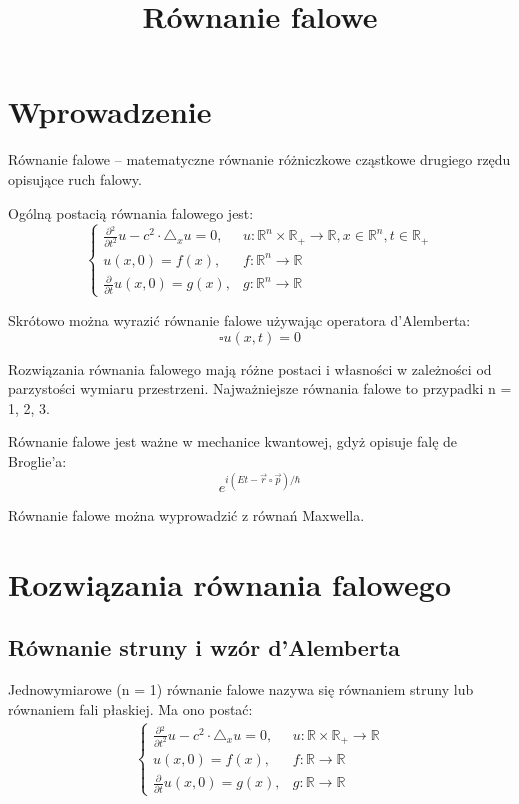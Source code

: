 \documentclass{article}
\begin{document}
\title{Równanie falowe}
\maketitle

\section*{Wprowadzenie}
Równanie falowe – matematyczne równanie różniczkowe cząstkowe drugiego rzędu opisujące ruch falowy. 

Ogólną postacią równania falowego jest: 
\begin{displaymath}
{\begin{cases}{\frac {\partial {}^{2}}{\partial t^{2}}}u-c^{2}\cdot \triangle _{x}u=0,&u:\mathbb {R} ^{n}\times \mathbb {R} _{+}\to {}\mathbb {R} ,x\in \mathbb {R} ^{n},t\in \mathbb {R} _{+}\\[2pt]u(x,0)=f(x),&f:\mathbb {R} ^{n}\to \mathbb {R} \\[2pt]{\frac {\partial {}}{\partial t}}u(x,0)=g(x),&g:\mathbb {R} ^{n}\to \mathbb {R} \end{cases}}
\end{displaymath}

Skrótowo można wyrazić równanie falowe używając operatora d’Alemberta: 
$$ \square u(x,t)=0 $$

Rozwiązania równania falowego mają różne postaci i własności w zależności od parzystości wymiaru przestrzeni. Najważniejsze równania falowe to przypadki n = 1, 2, 3.

Równanie falowe jest ważne w mechanice kwantowej, gdyż opisuje falę de Broglie’a: 
\[ e^{i(Et-{\vec {r}}\circ {\vec {p}})/\hbar } \]

Równanie falowe można wyprowadzić z równań Maxwella. 

\section*{Rozwiązania równania falowego}
\subsection*{Równanie struny i wzór d'Alemberta}
Jednowymiarowe (n = 1) równanie falowe nazywa się równaniem struny lub równaniem fali płaskiej. Ma ono postać: 
\begin{gather*}
{\begin{cases}{\frac {\partial {}^{2}}{\partial t^{2}}}u-c^{2}\cdot \triangle _{x}u=0,&u:\mathbb {R} \times \mathbb {R} _{+}\to {}\mathbb {R} \\u(x,0)=f(x),&f:\mathbb {R} \to \mathbb {R} \\[2pt]{\frac {\partial {}}{\partial t}}u(x,0)=g(x),&g:\mathbb {R} \to \mathbb {R} \end{cases}}
\end{gather*}
\end{document}
